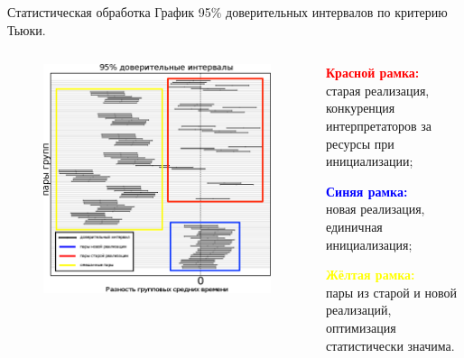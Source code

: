 \documentclass{beamer}
\begin{document}
\begin{frame}{Статистическая обработка}
    График 95\% доверительных интервалов по критерию Тьюки.
    \begin{columns}
        \begin{column}{0.7\textwidth}
            \begin{figure}[!h]
                \centering
                \includegraphics[width=.8\textheight]{tukey}
            \end{figure}
        \end{column}
        \begin{column}{0.4\textwidth}
            \textbf{\textcolor{red}{Красной рамка:}}\\
                старая реализация,
                конкуренция интерпретаторов
                за ресурсы при инициализации;

            \textbf{\textcolor{blue}{Синяя рамка:}}\\
                новая реализация, единичная инициализация;

            \textbf{\textcolor{yellow}{Жёлтая рамка:}}\\
                пары из старой и новой реализаций,
                оптимизация статистически значима.
        \end{column}
    \end{columns}
\end{frame}
\end{document}
